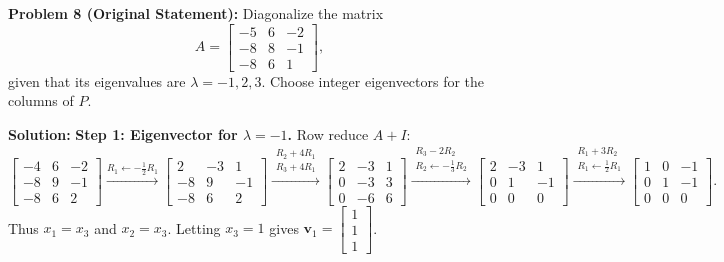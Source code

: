 \documentclass[11pt, letterpaper]{article}
\theoremstyle{definition}
\theoremstyle{remark}
\begin{document}
\vspace{0.8em}
\textbf{Problem 8 (Original Statement):}
Diagonalize the matrix
\[
A = \begin{bmatrix} -5 & 6 & -2 \\ -8 & 8 & -1 \\ -8 & 6 & 1 \end{bmatrix},
\]
given that its eigenvalues are $\lambda = -1, 2, 3$. Choose integer eigenvectors for the columns of $P$.

\textbf{Solution:}
\textbf{Step 1: Eigenvector for $\lambda = -1$.} Row reduce $A + I$:
\[
\begin{bmatrix} -4 & 6 & -2 \\ -8 & 9 & -1 \\ -8 & 6 & 2 \end{bmatrix}
\xrightarrow{R_{1} \leftarrow -\frac{1}{2}R_{1}}
\begin{bmatrix} 2 & -3 & 1 \\ -8 & 9 & -1 \\ -8 & 6 & 2 \end{bmatrix}
\xrightarrow{\substack{R_{2} + 4R_{1} \\ R_{3} + 4R_{1}}}
\begin{bmatrix} 2 & -3 & 1 \\ 0 & -3 & 3 \\ 0 & -6 & 6 \end{bmatrix}
\xrightarrow{\substack{R_{3} - 2R_{2} \\ R_{2} \leftarrow -\frac{1}{3}R_{2}}}
\begin{bmatrix} 2 & -3 & 1 \\ 0 & 1 & -1 \\ 0 & 0 & 0 \end{bmatrix}
\xrightarrow{\substack{R_{1} + 3R_{2} \\ R_{1} \leftarrow \frac{1}{2}R_{1}}}
\begin{bmatrix} 1 & 0 & -1 \\ 0 & 1 & -1 \\ 0 & 0 & 0 \end{bmatrix}.
\]
Thus $x_{1} = x_{3}$ and $x_{2} = x_{3}$. Letting $x_{3} = 1$ gives $\mathbf{v}_{1} = \begin{bmatrix} 1 \\ 1 \\ 1 \end{bmatrix}$.
\end{document}
